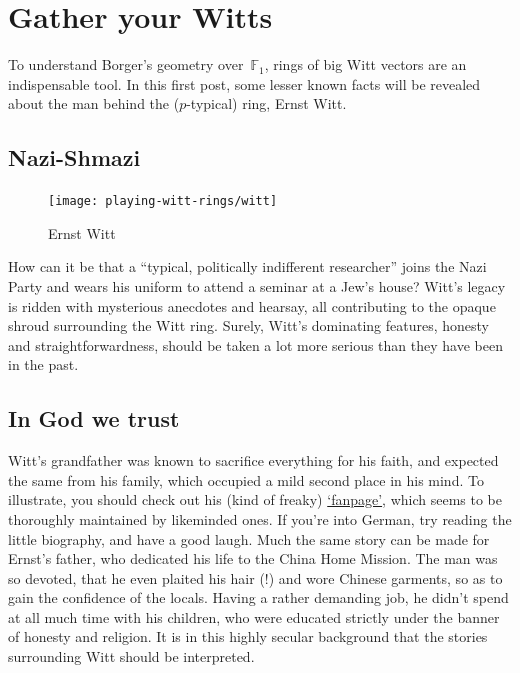 \section{Gather your Witts}
To understand Borger's geometry over~${\mathbb{F}_{1}}$, rings of big Witt vectors are an indispensable tool. In this first post, some lesser known facts will be revealed about the man behind the ($p$-typical) ring, Ernst Witt.

\subsection{Nazi-Shmazi}
\begin{figure}
  \centering
  \texttt{[image: playing-witt-rings/witt]}
  \caption{Ernst Witt}
\end{figure}
How can it be that a ``typical, politically indifferent researcher'' joins the Nazi Party and wears his uniform to attend a seminar at a Jew's house? Witt's legacy is ridden with mysterious anecdotes and hearsay, all contributing to the opaque shroud surrounding the Witt ring. Surely, Witt's dominating features, honesty and straightforwardness, should be taken a lot more serious than they have been in the past.

\subsection{In God we trust}
Witt's grandfather was known to sacrifice everything for his faith, and expected the same from his family, which occupied a mild second place in his mind. To illustrate, you should check out his (kind of freaky) \href{http://www.norddeutsche-lehrer-gemeinschaft.de/heinrich-witt.html}{`fanpage'}, which seems to be thoroughly maintained by likeminded ones. If you're into German, try reading the little biography, and have a good laugh. Much the same story can be made for Ernst's father, who dedicated his life to the China Home Mission. The man was so devoted, that he even plaited his hair (!) and wore Chinese garments, so as to gain the confidence of the locals. Having a rather demanding job, he didn't spend at all much time with his children, who were educated strictly under the banner of honesty and religion. It is in this highly secular background that the stories surrounding Witt should be interpreted.


